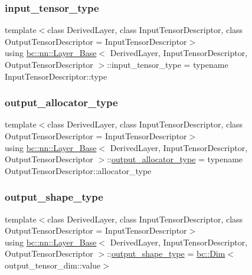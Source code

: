 \subsubsection{\texorpdfstring{input\+\_\+tensor\+\_\+type}{input\_tensor\_type}}
{\footnotesize\ttfamily template$<$class Derived\+Layer, class Input\+Tensor\+Descriptor, class Output\+Tensor\+Descriptor = Input\+Tensor\+Descriptor$>$ \\
using \hyperlink{structbc_1_1nn_1_1Layer__Base}{bc\+::nn\+::\+Layer\+\_\+\+Base}$<$ Derived\+Layer, Input\+Tensor\+Descriptor, Output\+Tensor\+Descriptor $>$\+::input\+\_\+tensor\+\_\+type =  typename Input\+Tensor\+Descriptor\+::type}

\mbox{\label{structbc_1_1nn_1_1Layer__Base_aca74d834a3499b69d2aa7f596a76a9c4}} 
\subsubsection{\texorpdfstring{output\+\_\+allocator\+\_\+type}{output\_allocator\_type}}
{\footnotesize\ttfamily template$<$class Derived\+Layer, class Input\+Tensor\+Descriptor, class Output\+Tensor\+Descriptor = Input\+Tensor\+Descriptor$>$ \\
using \hyperlink{structbc_1_1nn_1_1Layer__Base}{bc\+::nn\+::\+Layer\+\_\+\+Base}$<$ Derived\+Layer, Input\+Tensor\+Descriptor, Output\+Tensor\+Descriptor $>$\+::\hyperlink{structbc_1_1nn_1_1Layer__Output__Base_a7cde98d6bf97cd5bc4aef4039ee26536}{output\+\_\+allocator\+\_\+type} =  typename Output\+Tensor\+Descriptor\+::allocator\+\_\+type}

\mbox{\label{structbc_1_1nn_1_1Layer__Base_a09221e8c188d9635fdaf6bfb21ed2026}} 
\subsubsection{\texorpdfstring{output\+\_\+shape\+\_\+type}{output\_shape\_type}}
{\footnotesize\ttfamily template$<$class Derived\+Layer, class Input\+Tensor\+Descriptor, class Output\+Tensor\+Descriptor = Input\+Tensor\+Descriptor$>$ \\
using \hyperlink{structbc_1_1nn_1_1Layer__Base}{bc\+::nn\+::\+Layer\+\_\+\+Base}$<$ Derived\+Layer, Input\+Tensor\+Descriptor, Output\+Tensor\+Descriptor $>$\+::\hyperlink{structbc_1_1nn_1_1Layer__Output__Base_aa627047014ee5dff2b9cc1804c791815}{output\+\_\+shape\+\_\+type} =  \hyperlink{structbc_1_1Dim}{bc\+::\+Dim}$<$output\+\_\+tensor\+\_\+dim\+::value$>$}

